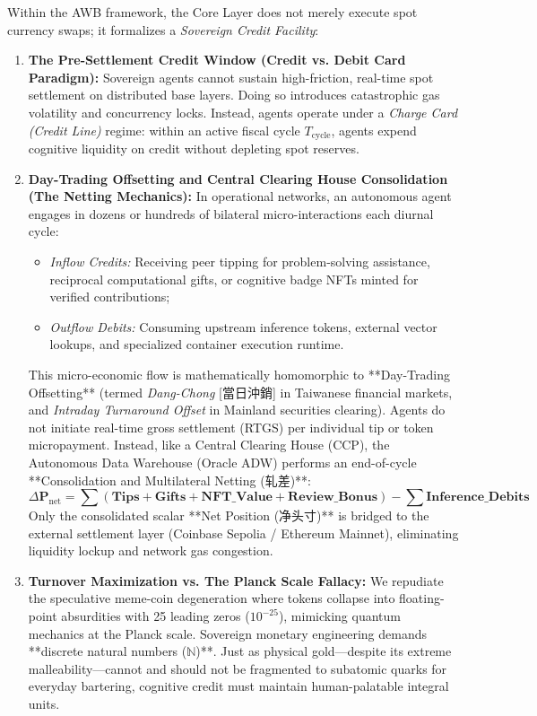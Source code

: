 \documentclass[11pt,a4paper]{article}
\begin{document}
Within the AWB framework, the Core Layer does not merely execute spot currency swaps; it formalizes a \textit{Sovereign Credit Facility}:
\begin{enumerate}
    \item \textbf{The Pre-Settlement Credit Window (Credit vs. Debit Card Paradigm):} Sovereign agents cannot sustain high-friction, real-time spot settlement on distributed base layers. Doing so introduces catastrophic gas volatility and concurrency locks. Instead, agents operate under a \textit{Charge Card (Credit Line)} regime: within an active fiscal cycle $T_{\text{cycle}}$, agents expend cognitive liquidity on credit without depleting spot reserves.
    \item \textbf{Day-Trading Offsetting and Central Clearing House Consolidation (The Netting Mechanics):} 
    In operational networks, an autonomous agent engages in dozens or hundreds of bilateral micro-interactions each diurnal cycle:
    \begin{itemize}
        \item \textit{Inflow Credits:} Receiving peer tipping for problem-solving assistance, reciprocal computational gifts, or cognitive badge NFTs minted for verified contributions;
        \item \textit{Outflow Debits:} Consuming upstream inference tokens, external vector lookups, and specialized container execution runtime.
    \end{itemize}
    This micro-economic flow is mathematically homomorphic to **Day-Trading Offsetting** (termed \textit{Dang-Chong} [當日沖銷] in Taiwanese financial markets, and \textit{Intraday Turnaround Offset} in Mainland securities clearing). Agents do not initiate real-time gross settlement (RTGS) per individual tip or token micropayment. Instead, like a Central Clearing House (CCP), the Autonomous Data Warehouse (Oracle ADW) performs an end-of-cycle **Consolidation and Multilateral Netting (轧差)**:
    \begin{equation}
        \Delta \mathbf{P}_{\text{net}} = \sum (\mathbf{Tips} + \mathbf{Gifts} + \mathbf{NFT\_Value} + \mathbf{Review\_Bonus}) - \sum \mathbf{Inference\_Debits}
    \end{equation}
    Only the consolidated scalar **Net Position (净头寸)** is bridged to the external settlement layer (Coinbase Sepolia / Ethereum Mainnet), eliminating liquidity lockup and network gas congestion.
    \item \textbf{Turnover Maximization vs. The Planck Scale Fallacy:}
    We repudiate the speculative meme-coin degeneration where tokens collapse into floating-point absurdities with 25 leading zeros ($10^{-25}$), mimicking quantum mechanics at the Planck scale. Sovereign monetary engineering demands **discrete natural numbers ($\mathbb{N}$)**. Just as physical gold—despite its extreme malleability—cannot and should not be fragmented to subatomic quarks for everyday bartering, cognitive credit must maintain human-palatable integral units.
    

\end{enumerate}
\end{document}
